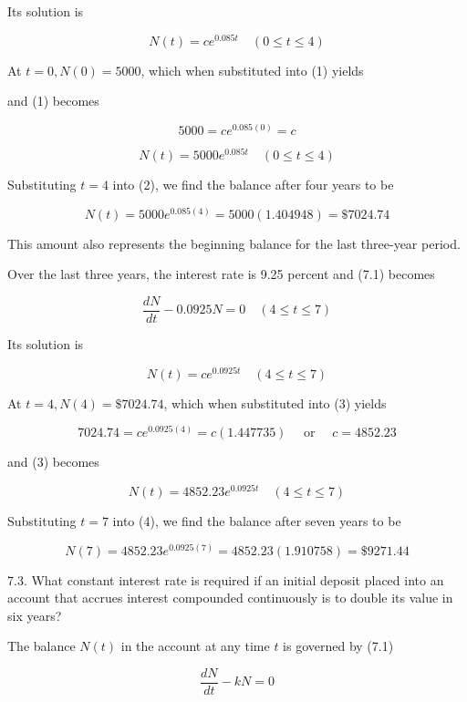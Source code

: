 \documentclass[10pt]{article}
\begin{document}
Its solution is


\begin{equation*}
N(t)=c e^{0.085 t} \quad(0 \leq t \leq 4) \tag{1}
\end{equation*}


At $t=0, N(0)=5000$, which when substituted into (1) yields

and (1) becomes

$$
5000=c e^{0.085(0)}=c
$$


\begin{equation*}
N(t)=5000 e^{0.085 t} \quad(0 \leq t \leq 4) \tag{2}
\end{equation*}


Substituting $t=4$ into (2), we find the balance after four years to be

$$
N(t)=5000 e^{0.085(4)}=5000(1.404948)=\$ 7024.74
$$

This amount also represents the beginning balance for the last three-year period.

Over the last three years, the interest rate is 9.25 percent and (7.1) becomes

$$
\frac{d N}{d t}-0.0925 N=0 \quad(4 \leq t \leq 7)
$$

Its solution is


\begin{equation*}
N(t)=c e^{0.0925 t} \quad(4 \leq t \leq 7) \tag{3}
\end{equation*}


At $t=4, N(4)=\$ 7024.74$, which when substituted into (3) yields

$$
7024.74=c e^{0.0925(4)}=c(1.447735) \quad \text { or } \quad c=4852.23
$$

and (3) becomes


\begin{equation*}
N(t)=4852.23 e^{0.0925 t} \quad(4 \leq t \leq 7) \tag{4}
\end{equation*}


Substituting $t=7$ into (4), we find the balance after seven years to be

$$
N(7)=4852.23 e^{0.0925(7)}=4852.23(1.910758)=\$ 9271.44
$$

7.3. What constant interest rate is required if an initial deposit placed into an account that accrues interest compounded continuously is to double its value in six years?

The balance $N(t)$ in the account at any time $t$ is governed by (7.1)

$$
\frac{d N}{d t}-k N=0
$$
\end{document}
